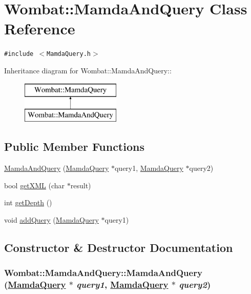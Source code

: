 \hypertarget{classWombat_1_1MamdaAndQuery}{
\section{Wombat::Mamda\-And\-Query Class Reference}
\label{classWombat_1_1MamdaAndQuery}
}
{\tt \#include $<$Mamda\-Query.h$>$}

Inheritance diagram for Wombat::Mamda\-And\-Query::\begin{figure}[H]
\begin{center}
\leavevmode
\includegraphics[height=2cm]{classWombat_1_1MamdaAndQuery}
\end{center}
\end{figure}
\subsection*{Public Member Functions}
\begin{CompactItemize}
\item 
\hyperlink{classWombat_1_1MamdaAndQuery_da25d1e78d515937a1bdc72f3b428e50}{Mamda\-And\-Query} (\hyperlink{classWombat_1_1MamdaQuery}{Mamda\-Query} $\ast$query1, \hyperlink{classWombat_1_1MamdaQuery}{Mamda\-Query} $\ast$query2)
\item 
bool \hyperlink{classWombat_1_1MamdaAndQuery_a48717e120cf124653793d81c04cc74d}{get\-XML} (char $\ast$result)
\item 
int \hyperlink{classWombat_1_1MamdaAndQuery_63e70b86bfe67f53fd64bea4b9a201a4}{get\-Depth} ()
\item 
void \hyperlink{classWombat_1_1MamdaAndQuery_733bb9aab0d48fd2c26cf752e4f6822a}{add\-Query} (\hyperlink{classWombat_1_1MamdaQuery}{Mamda\-Query} $\ast$query1)
\end{CompactItemize}


\subsection{Constructor \& Destructor Documentation}
\hypertarget{classWombat_1_1MamdaAndQuery_da25d1e78d515937a1bdc72f3b428e50}{
\subsubsection[MamdaAndQuery]{\setlength{\rightskip}{0pt plus 5cm}Wombat::Mamda\-And\-Query::Mamda\-And\-Query (\hyperlink{classWombat_1_1MamdaQuery}{Mamda\-Query} $\ast$ {\em query1}, \hyperlink{classWombat_1_1MamdaQuery}{Mamda\-Query} $\ast$ {\em query2})}}
\label{classWombat_1_1MamdaAndQuery_da25d1e78d515937a1bdc72f3b428e50}




